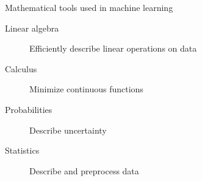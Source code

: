 
\begin{frame}{Mathematical tools used in machine learning}
  \begin{description}
  \item[Linear algebra] Efficiently describe linear operations on data
  \item[Calculus] Minimize continuous functions
  \item[Probabilities] Describe uncertainty
  \item[Statistics] Describe and preprocess data
  \end{description}
\end{frame}
